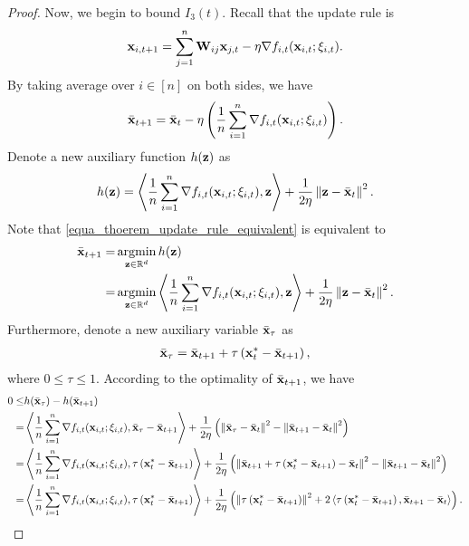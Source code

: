 \documentclass{article}
\begin{document}
\begin{proof}
Now, we begin to bound $I_3(t)$. Recall that the update rule is 
\begin{align}
\nonumber
{\bf x}_{i,t+1} = \sum_{j=1}^n {\bf W}_{ij}{\bf x}_{j,t} - \eta \nabla f_{i,t}({\bf x}_{i,t};\xi_{i,t}).
\end{align} By taking average over $i\in[n]$ on both sides, we have 
\begin{align}
\label{equa_thoerem_update_rule_equivalent}
\bar{{\bf x}}_{t+1} = \bar{{\bf x}}_t - \eta \left( \frac{1}{n}\sum_{i=1}^n \nabla f_{i,t}({\bf x}_{i,t};\xi_{i,t}) \right).
\end{align} 
Denote a new auxiliary function $h({\bf z})$ as 
\begin{align}
\nonumber
h({\bf z}) = \left\langle\frac{1}{n}\sum_{i=1}^n \nabla f_{i,t}({\bf x}_{i,t};\xi_{i,t}), {\bf z} \right\rangle + \frac{1}{2\eta}\left\lVert{\bf z} - \bar{{\bf x}}_t\right\rVert^2.
\end{align} Note that \eqref{equa_thoerem_update_rule_equivalent} is equivalent to 
\begin{align}
\nonumber
\bar{\x}_{t+1} = & \argmin_{\z\in\RR^d} h(\z) \\ \nonumber
= & \argmin_{\z\in\RR^d} \lrangle{\frac{1}{n}\sum_{i=1}^n \nabla f_{i,t}(\x_{i,t};\xi_{i,t}), \z} + \frac{1}{2\eta}\lrnorm{\z - \bar{\x}_t}^2.
\end{align} Furthermore, denote a new auxiliary variable $\bar{{\bf x}}_{\tau}$ as  
\begin{align}
\nonumber
\bar{{\bf x}}_{\tau} = \bar{{\bf x}}_{t+1} + \tau \left( {\bf x}_t^\ast - \bar{{\bf x}}_{t+1} \right),
\end{align} where $0\le \tau \le 1$. According to the optimality of $\bar{{\bf x}}_{t+1}$, we have
\begin{align}
\nonumber
0 \le & h(\bar{\x}_{\tau}) - h(\bar{\x}_{t+1}) \\ \nonumber
= & \lrangle{\frac{1}{n}\sum_{i=1}^n \nabla f_{i,t}(\x_{i,t};\xi_{i,t}), \bar{\x}_{\tau} - \bar{\x}_{t+1}} + \frac{1}{2\eta}\lrincir{ \lrnorm{\bar{\x}_{\tau} - \bar{\x}_t}^2 - \lrnorm{\bar{\x}_{t+1} - \bar{\x}_t}^2 } \\ \nonumber
= & \lrangle{\frac{1}{n}\sum_{i=1}^n \nabla f_{i,t}(\x_{i,t};\xi_{i,t}), \tau \lrincir{\x_t^\ast - \bar{\x}_{t+1}}} + \frac{1}{2\eta}\lrincir{ \lrnorm{\bar{\x}_{t+1} + \tau \lrincir{\x_t^\ast - \bar{\x}_{t+1}} - \bar{\x}_t}^2 - \lrnorm{\bar{\x}_{t+1} - \bar{\x}_t}^2 } \\ \nonumber
= & \lrangle{\frac{1}{n}\sum_{i=1}^n \nabla f_{i,t}(\x_{i,t};\xi_{i,t}), \tau \lrincir{\x_t^\ast - \bar{\x}_{t+1}}} + \frac{1}{2\eta}\lrincir{ \lrnorm{\tau \lrincir{\x_t^\ast - \bar{\x}_{t+1}}}^2 + 2\lrangle{\tau \lrincir{\x_t^\ast - \bar{\x}_{t+1}}, \bar{\x}_{t+1} - \bar{\x}_t } }.

\end{align}
\end{proof}
\end{document}
